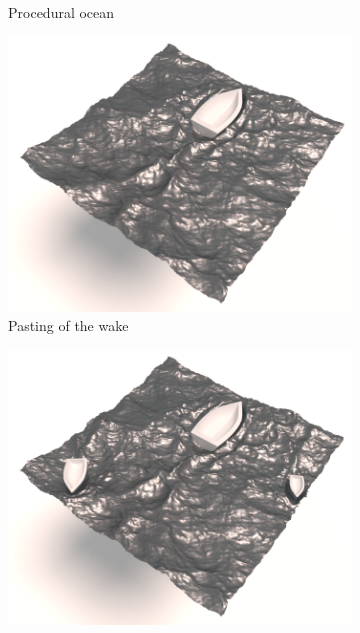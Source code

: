 \begin{figure}[th!]
\begin{subfigure}[b]{0.48\linewidth}
\caption{\label{fig:result_detail:ocean}\scriptsize{Procedural ocean}}
    \end{subfigure}
    \hspace{0.1cm}
    \begin{subfigure}[b]{0.48\linewidth}
    \centering
\includegraphics[width=\textwidth]{images/fluidsculpting-mig2016/results/boatOnOcean.png}
\caption{\label{fig:result_detail:paste}\scriptsize{Pasting of the wake}}
    \end{subfigure}
    \hspace{0.1cm}
    \begin{subfigure}[b]{0.48\linewidth}
    \centering
\includegraphics[width=\textwidth]{images/fluidsculpting-mig2016/results/threeBoatsOnOcean.png}

\end{subfigure}
\end{figure}
